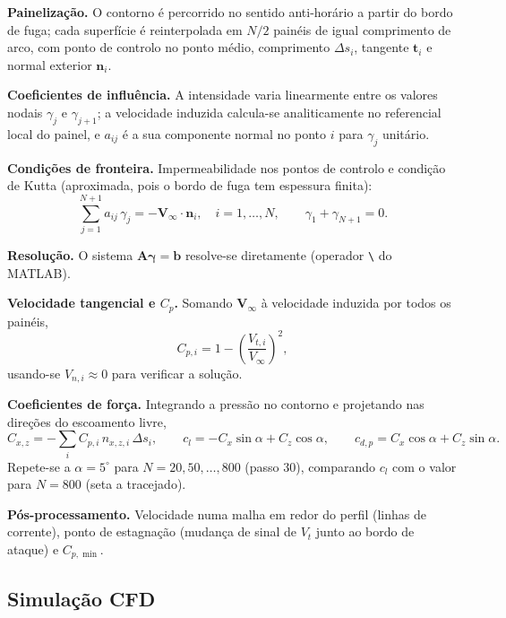 \begin{etapas}
  \item \textbf{Painelização.} O contorno é percorrido no sentido anti-horário a
  partir do bordo de fuga; cada superfície é reinterpolada em
  $N/2$ painéis de igual comprimento de arco, com ponto de controlo no ponto
  médio, comprimento $\Delta s_i$, tangente $\mathbf{t}_i$ e normal exterior
  $\mathbf{n}_i$.
  \item \textbf{Coeficientes de influência.} A intensidade varia linearmente
  entre os valores nodais $\gamma_j$ e $\gamma_{j+1}$; a velocidade induzida
  calcula-se analiticamente no referencial local do painel, e $a_{ij}$ é a sua
  componente normal no ponto $i$ para $\gamma_j$ unitário.
  \item \textbf{Condições de fronteira.} Impermeabilidade nos pontos de
  controlo e condição de Kutta (aproximada, pois o bordo de fuga tem espessura
  finita):
  \[
    \sum_{j=1}^{N+1} a_{ij}\,\gamma_j = -\mathbf{V}_\infty \cdot \mathbf{n}_i ,
    \quad i = 1,\dots,N, \qquad \gamma_1 + \gamma_{N+1} = 0 .
  \]
  \item \textbf{Resolução.} O sistema $\mathbf{A}\boldsymbol{\gamma} = \mathbf{b}$
  resolve-se diretamente (operador \texttt{\textbackslash} do MATLAB).
  \item \textbf{Velocidade tangencial e $C_p$.} Somando $\mathbf{V}_\infty$ à
  velocidade induzida por todos os painéis,
  \[
    C_{p,i} = 1 - \left(\frac{V_{t,i}}{V_\infty}\right)^2 ,
  \]
  usando-se $V_{n,i} \approx 0$ para verificar a solução.
  \item \textbf{Coeficientes de força.} Integrando a pressão no contorno e
  projetando nas direções do escoamento livre,
  \[
    C_{x,z} = -\sum_i C_{p,i}\, n_{x,z,i}\,\Delta s_i , \qquad
    c_l = -C_x \sin\alpha + C_z \cos\alpha , \qquad
    c_{d,p} = C_x \cos\alpha + C_z \sin\alpha .
  \]
  Repete-se a $\alpha = 5^\circ$ para $N = 20, 50, \dots, 800$ (passo 30),
  comparando $c_l$ com o valor para $N = 800$ (seta a tracejado).
  \item \textbf{Pós-processamento.} Velocidade numa malha em redor do perfil
  (linhas de corrente), ponto de estagnação (mudança de sinal de $V_t$ junto ao
  bordo de ataque) e $C_{p,\min}$.
\end{etapas}


\subsection*{Simulação CFD}

